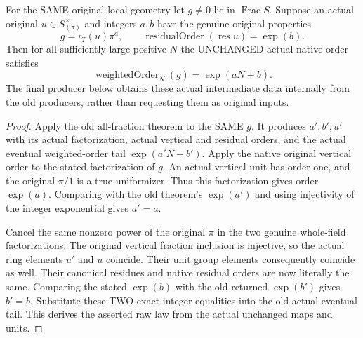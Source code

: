 \begin{lemma}
\label{lem:gauss-common-leading-actual-tuple-tail}
\leanok
For the SAME original local geometry let $g\ne0$ lie in
$\operatorname{Frac}S$. Suppose an actual original $u\in S_{(\pi)}^\times$
and integers $a,b$ have the genuine original properties
\[
 g=\iota_T(u)\pi^a,\qquad
 \operatorname{residualOrder}(\operatorname{res}u)=\exp(b).
\]
Then for all sufficiently large positive $N$ the UNCHANGED actual native
order satisfies
\[
 \operatorname{weightedOrder}_N(g)=\exp(aN+b).
\]
The final producer below obtains these actual intermediate data internally
from the old producers, rather than requesting them as original inputs.
\end{lemma}
\begin{proof}
Apply the old all-fraction theorem to the SAME $g$. It produces
$a',b',u'$ with its actual factorization, actual vertical and residual
orders, and the actual eventual weighted-order tail
$\exp(a'N+b')$.
Apply the native original vertical order to the stated factorization of
$g$. An actual vertical unit has order one, and the original $\pi/1$
is a true uniformizer. Thus this factorization gives order $\exp(a)$.
Comparing with the old theorem's $\exp(a')$ and using injectivity of the
integer exponential gives $a'=a$.

Cancel the same nonzero power of the original $\pi$ in the two genuine
whole-field factorizations. The original vertical fraction inclusion is
injective, so the actual ring elements $u'$ and $u$ coincide. Their unit
group elements consequently coincide as well. Their canonical residues
and native residual orders are now literally the same. Comparing the
stated $\exp(b)$ with the old returned $\exp(b')$ gives $b'=b$.
Substitute these TWO exact integer equalities into the old actual
eventual tail. This derives the asserted raw law from the actual
unchanged maps and units.
\end{proof}

